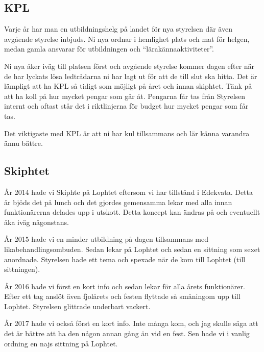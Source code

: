 \documentclass[10pt]{article}
\begin{document}
    \subsection{KPL}
    
    Varje år har man en utbildningshelg på landet för nya styrelsen där även avgående styrelse inbjuds. Ni nya ordnar i hemlighet plats och mat för helgen, medan gamla ansvarar för utbildningen och ``lärakännaaktiviteter''.
    
    Ni nya åker iväg till platsen först och avgående styrelse kommer dagen efter när de har lyckats lösa ledtrådarna ni har lagt ut för att de till slut ska hitta. Det är lämpligt att ha KPL så tidigt som möjligt på året och innan skiphtet. Tänk på att ha koll på hur mycket pengar som går åt. Pengarna får tas från Styrelsen internt och oftast står det i riktlinjerna för budget hur mycket pengar som får tas.
    
    Det viktigaste med KPL är att ni har kul tillsammans och lär känna varandra ännu bättre.
    
    \subsection{Skiphtet}
    
    År 2014 hade vi Skiphte på Lophtet eftersom vi har tillstånd i Edekvata. Detta år bjöds det på lunch och det gjordes gemensamma lekar med alla innan funktionärerna delades upp i utskott. Detta koncept kan ändras på och eventuellt åka iväg någonstans.
    
    År 2015 hade vi en minder utbildning på dagen tillsammans med likabehandlingsombuden. Sedan lekar på Lophtet och sedan en sittning som sexet anordnade. Styrelsen hade ett tema och spexade när de kom till Lophtet (till sittningen).
    
    År 2016 hade vi först en kort info och sedan lekar för alla årets funktionärer. Efter ett tag anslöt även fjolårets och festen flyttade så småningom upp till Lophtet. Styrelsen glittrade underbart vackert.
    
    År 2017 hade vi också först en kort info. Inte många kom, och jag skulle säga att det är bättre att ha den någon annan gång än vid en fest. Sen hade vi i vanlig ordning en najs sittning på Lophtet.
    
\end{document}
